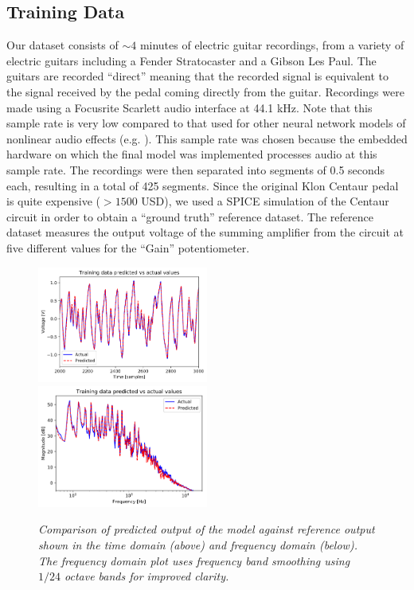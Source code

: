 \documentclass[twoside,a4paper]{article}
\begin{document}
\subsection{Training Data}
Our dataset consists of $\sim 4$ minutes of electric guitar recordings,
from a variety of electric guitars including a Fender Stratocaster
and a Gibson Les Paul. The guitars are recorded ``direct'' meaning
that the recorded signal is equivalent to the signal received by the
pedal coming directly from the guitar. Recordings were made using a
Focusrite Scarlett audio interface at 44.1 kHz. Note that this
sample rate is very low compared to that used for other neural network
models of nonlinear audio effects (e.g. \cite{WaveNetVA,VArnn}). This sample
rate was chosen because the embedded hardware on which the final model
was implemented processes audio at this sample rate. The recordings
were then separated into segments of 0.5 seconds each, resulting in a
total of 425 segments.
\newline\newline
Since the original Klon Centaur pedal is quite expensive ($> 1500$ USD),
we used a SPICE simulation of the Centaur circuit in order to obtain a
``ground truth'' reference dataset. The reference dataset measures the
output voltage of the summing amplifier from the circuit at five
different values for the ``Gain'' potentiometer.
%
\begin{figure}
    \centering
    \includegraphics[width=0.5\textwidth]{TimeDomain.png}
    \centering
    \includegraphics[width=0.5\textwidth]{FreqDomain.png}
    \caption{\label{fig:freqandtime} {\it Comparison of
        predicted output of the model against reference
        output shown in the time domain (above) and frequency
        domain (below). The frequency domain plot uses frequency
        band smoothing using $1/24$ octave bands for improved clarity.}}
\end{figure}
\end{document}
